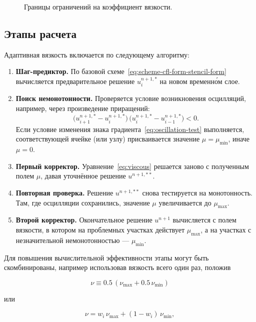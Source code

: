 \documentclass[14pt]{report}
\begin{document}
\begin{figure}[h]
\centering

\caption{Границы ограничений на коэффициент вязкости.}
\label{fig:adaptive-artificial-viscosity-coeff-bounds}
\end{figure}


\subsection{Этапы расчета}
Адаптивная вязкость включается по следующему алгоритму:
\begin{enumerate}
\item \textbf{Шаг-предиктор.} По базовой схеме~\eqref{eq:scheme-cfl-form-stencil-form} вычисляется предварительное решение $u^{n+1,*}_i$ на новом временн\'{о}м слое.
\item \textbf{Поиск немонотонности.} Проверяется условие возникновения осцилляций, например, через произведение приращений:
\begin{equation}
\bigl(u_{i+1}^{n+1,*} - u_i^{n+1,*}\bigr) \,
\bigl(u_i^{n+1,*} - u_{i-1}^{n+1,*}\bigr) < 0.
\label{eq:oscillation-test}
\end{equation}
Если условие изменения знака градиента~\eqref{eq:oscillation-test} выполняется, соответствующей ячейке (или узлу) присваивается значение $\mu = \mu_{\min}$, иначе $\mu = 0$.
\item \textbf{Первый корректор.} Уравнение~\eqref{eq:viscous} решается заново с полученным полем $\mu$, давая уточнённое решение $u^{n+1,**}$.
\item \textbf{Повторная проверка.} Решение $u^{n+1,**}$ снова тестируется на монотонность. Там, где осцилляции сохранились, значение $\mu$ увеличивается до $\mu_{\max}$.
\item \textbf{Второй корректор.} Окончательное решение $u^{n+1}$ вычисляется с полем вязкости, в котором на проблемных участках действует $\mu_{\max}$, а на участках с незначительной немонотонностью --- $\mu_{\min}$.
\end{enumerate}
Для повышения вычислительной эффективности этапы могут быть скомбинированы, например использовав вязкость всего один раз, положив

\[
    \nu \equiv 0.5\, (\nu_{\max} + 0.5\, \nu_{\min})
\]

или

\[
    \nu = w_i\,\nu_{\max}  + (1 - w_i)\, \nu_{\min},
\]
\end{document}
